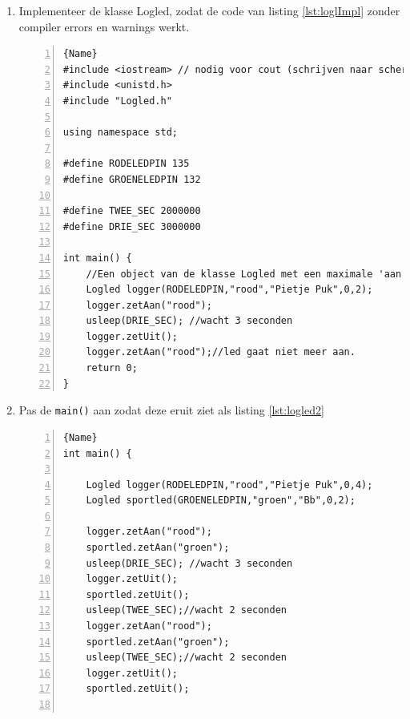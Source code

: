 \begin{enumerate}[label=\alph*]
	\item Implementeer de klasse Logled, zodat de code van listing \ref{lst:loglImpl} zonder compiler errors en warnings werkt.
	\begin{lstlisting}[caption=Een test van de klasse \texttt{LogLed}. ,frame=trbl,firstnumber=1,numbers=left,label={lst:loglImpl}]{Name}
#include <iostream> // nodig voor cout (schrijven naar scherm)
#include <unistd.h>
#include "Logled.h"

using namespace std;

#define RODELEDPIN 135
#define GROENELEDPIN 132

#define TWEE_SEC 2000000
#define DRIE_SEC 3000000

int main() {
	//Een object van de klasse Logled met een maximale 'aan' tijd van 2 seconde 
	Logled logger(RODELEDPIN,"rood","Pietje Puk",0,2);
	logger.zetAan("rood");
	usleep(DRIE_SEC); //wacht 3 seconden
	logger.zetUit();
	logger.zetAan("rood");//led gaat niet meer aan.
	return 0;
}	
\end{lstlisting}
\item  Pas de \texttt{main()} aan zodat deze eruit ziet als listing \ref{lst:logled2}
\begin{lstlisting}[caption=Twee objecten van de klasse \texttt{LogLed}. ,frame=trbl,firstnumber=1,numbers=left,label={lst:logled2}]{Name}
int main() {
	
	Logled logger(RODELEDPIN,"rood","Pietje Puk",0,4);
	Logled sportled(GROENELEDPIN,"groen","Bb",0,2);
	
	logger.zetAan("rood");
	sportled.zetAan("groen");
	usleep(DRIE_SEC); //wacht 3 seconden
	logger.zetUit();
	sportled.zetUit();
	usleep(TWEE_SEC);//wacht 2 seconden
	logger.zetAan("rood");
	sportled.zetAan("groen");
	usleep(TWEE_SEC);//wacht 2 seconden
	logger.zetUit();
	sportled.zetUit();
	

\end{lstlisting}
\end{enumerate}
